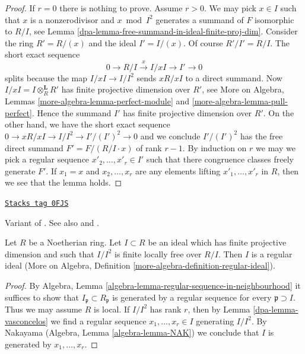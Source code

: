 \begin{proof}

If $r = 0$ there is nothing to prove. Assume $r > 0$. We may pick
$x \in I$ such that $x$ is a nonzerodivisor and $x \bmod I^2$
generates a summand of $F$ isomorphic to $R/I$, see
Lemma \ref{dpa-lemma-free-summand-in-ideal-finite-proj-dim}.
Consider the ring $R' = R/(x)$ and the ideal $I' = I/(x)$.
Of course $R'/I' = R/I$. The short exact sequence
$$
0 \to R/I \xrightarrow{x} I/xI \to I' \to 0
$$
splits because the map $I/xI \to I/I^2$ sends $xR/xI$
to a direct summand. Now $I/xI = I \otimes_R^\mathbf{L} R'$ has
finite projective dimension over $R'$, see
More on Algebra, Lemmas \ref{more-algebra-lemma-perfect-module} and
\ref{more-algebra-lemma-pull-perfect}.
Hence the summand $I'$ has finite projective dimension over $R'$.
On the other hand, we have the short exact sequence
$0 \to xR/xI \to I/I^2 \to I'/(I')^2 \to 0$ and we conclude
$I'/(I')^2$ has the free direct summand $F' = F/(R/I \cdot x)$
of rank $r - 1$. By induction on $r$ we may
we pick a regular sequence $x'_2, \ldots, x'_r \in I'$
such that there congruence classes freely generate $F'$.
If $x_1 = x$ and $x_2, \ldots, x_r$ are any elements lifting
$x'_1, \ldots, x'_r$ in $R$, then we see that the lemma holds.
\end{proof}

\begin{proposition}
\label{dpa-proposition-regular-ideal}
\href{https://stacks.math.columbia.edu/tag/0FJS}{\texttt{Stacks tag 0FJS}}

\begin{reference}
Variant of \cite[Corollary 1]{Vasconcelos}. See also
\cite{Iyengar} and \cite{Ferrand-lci}.
\end{reference}
Let $R$ be a Noetherian ring. Let $I \subset R$ be an ideal
which has finite projective dimension and such that $I/I^2$ is
finite locally free over $R/I$. Then $I$ is a regular ideal
(More on Algebra, Definition \ref{more-algebra-definition-regular-ideal}).
\end{proposition}

\begin{proof}

By Algebra, Lemma \ref{algebra-lemma-regular-sequence-in-neighbourhood}
it suffices to show that $I_\mathfrak p \subset R_\mathfrak p$ is generated
by a regular sequence for every $\mathfrak p \supset I$. Thus we may
assume $R$ is local. If $I/I^2$ has rank $r$, then by
Lemma \ref{dpa-lemma-vasconcelos} we find a regular sequence
$x_1, \ldots, x_r \in I$ generating $I/I^2$. By
Nakayama (Algebra, Lemma \ref{algebra-lemma-NAK})
we conclude that $I$ is generated by $x_1, \ldots, x_r$.
\end{proof}

